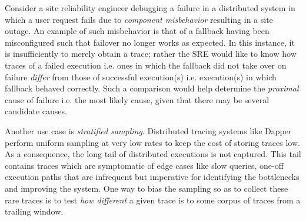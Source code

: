 Consider a site reliability engineer debugging a failure in a distributed system in which a user request fails due to \emph{component misbehavior} resulting in a site outage. An example of such misbehavior is that of a fallback having been misconfigured such that failover no longer works as expected. In this instance, it is insufficiently to merely obtain a trace; rather the SRE would like to know how traces of a failed execution i.e. ones in which the fallback did not take over on failure \emph{differ} from those of successful execution(s) i.e. execution(s) in which fallback behaved correctly. Such a comparison would help determine the \textit{proximal} cause of failure i.e. the most likely cause,  given that there may be several candidate causes.


Another use case is \emph{stratified sampling}. Distributed tracing systems like Dapper~\cite{36356} perform uniform sampling at very low rates to keep the cost of storing traces low.  As a consequence, the long tail of distributed executions is not captured. This tail contains traces which are symptomatic of edge cases like slow queries, one-off execution paths that are infrequent but imperative for identifying the bottlenecks and improving the system. One way to bias the sampling so as to collect these rare traces is to test \emph{how different} a given trace is to some corpus of traces from a trailing window.




